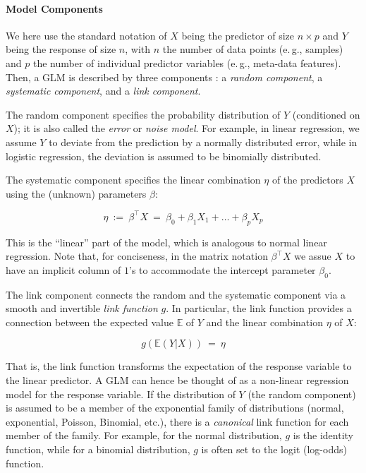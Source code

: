 \paragraph{Model Components}
\label{sec:Factorization:sub:Methods:sub:GLMs:par:Overview}

We here use the standard notation of $X$ being the predictor of size $n \times p$ and $Y$ being the response of size $n$,
with $n$ the number of data points (e.\,g., samples)
and $p$ the number of individual predictor variables (e.\,g., meta-data features).
Then, a \ac{GLM} is described by three components \cite{McCullagh1989}:
a \emph{random component}, a \emph{systematic component}, and a \emph{link component}.

The random component specifies the probability distribution of $Y$ (conditioned on $X$);
it is also called the \emph{error} or \emph{noise model}.
For example, in linear regression, we assume $Y$ to deviate from the prediction by a normally distributed error,
while in logistic regression, the deviation is assumed to be binomially distributed.

The systematic component specifies the linear combination $\eta$ of the predictors $X$
using the (unknown) parameters $\beta$:

\begin{equation}
\label{sec:Factorization:sub:GLM:eq:eta}
    \eta ~:=~ \beta^\intercal X ~=~ \beta_0 + \beta_1 X_1 + \dots + \beta_p X_p
\end{equation}

This is the ``linear'' part of the model, which is analogous to normal linear regression.
Note that, for conciseness, in the matrix notation $\beta^\intercal X$ we assue $X$ to have
an implicit column of $1$'s to accommodate the intercept parameter $\beta_0$.

The link component connects the random and the systematic component via a smooth and invertible \emph{link function} $g$.
In particular, the link function provides a connection between the expected value $\mathbb{E}$ of $Y$
and the linear combination $\eta$ of $X$:

\begin{equation}
\label{sec:Factorization:sub:GLM:eq:link}
    g(\mathbb{E}(Y|X)) ~=~ \eta
\end{equation}

That is, the link function transforms the expectation of the response variable to the linear predictor.
A \ac{GLM} can hence be thought of as a non-linear regression model for the response variable.
If the distribution of $Y$ (the random component) is assumed
to be a member of the exponential family of distributions (normal, exponential, Poisson, Binomial, etc.),
there is a \emph{canonical} link function for each member of the family.
For example, for the normal distribution, $g$ is the identity function,
while for a binomial distribution, $g$ is often set to the logit (log-odds) function.

